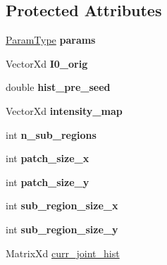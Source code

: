 \subsection*{Protected Attributes}
\begin{DoxyCompactItemize}
\item 
\hypertarget{classLSCV_a160aa8bd803b8e37777ce494e79aaddb}{\hyperlink{structLSCVParams}{Param\-Type} {\bfseries params}}\label{classLSCV_a160aa8bd803b8e37777ce494e79aaddb}

\item 
\hypertarget{classLSCV_a19388929e66da4a1230a44ca3dd2131a}{Vector\-Xd {\bfseries I0\-\_\-orig}}\label{classLSCV_a19388929e66da4a1230a44ca3dd2131a}

\item 
\hypertarget{classLSCV_a6315aca295d99e8b2c77cf210ee8d794}{double {\bfseries hist\-\_\-pre\-\_\-seed}}\label{classLSCV_a6315aca295d99e8b2c77cf210ee8d794}

\item 
\hypertarget{classLSCV_a5ca3b9476e31b54b3ee88f708e083022}{Vector\-Xd {\bfseries intensity\-\_\-map}}\label{classLSCV_a5ca3b9476e31b54b3ee88f708e083022}

\item 
\hypertarget{classLSCV_a66085fce3995f4faf1947e6bd5cc28d5}{int {\bfseries n\-\_\-sub\-\_\-regions}}\label{classLSCV_a66085fce3995f4faf1947e6bd5cc28d5}

\item 
\hypertarget{classLSCV_a6ab7f3176b0801585173e9cca276f973}{int {\bfseries patch\-\_\-size\-\_\-x}}\label{classLSCV_a6ab7f3176b0801585173e9cca276f973}

\item 
\hypertarget{classLSCV_a06f2f8488b7732f594ded2831a64cc87}{int {\bfseries patch\-\_\-size\-\_\-y}}\label{classLSCV_a06f2f8488b7732f594ded2831a64cc87}

\item 
\hypertarget{classLSCV_a37e1d05ef7cc91419fff69da37aed34b}{int {\bfseries sub\-\_\-region\-\_\-size\-\_\-x}}\label{classLSCV_a37e1d05ef7cc91419fff69da37aed34b}

\item 
\hypertarget{classLSCV_a32d50d3f08dc6f9dcc7af579baabf589}{int {\bfseries sub\-\_\-region\-\_\-size\-\_\-y}}\label{classLSCV_a32d50d3f08dc6f9dcc7af579baabf589}

\item 
\hypertarget{classLSCV_a5d4c51f8b3ec9caf8ebeb9836d367237}{Matrix\-Xd \hyperlink{classLSCV_a5d4c51f8b3ec9caf8ebeb9836d367237}{curr\-\_\-joint\-\_\-hist}}\label{classLSCV_a5d4c51f8b3ec9caf8ebeb9836d367237}


\end{DoxyCompactItemize}
